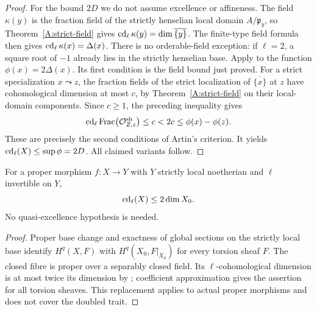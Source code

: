 \begin{proof}
For the bound $2D$ we do not assume excellence or affineness. The field $\kappa(y)$ is the fraction field of the strictly henselian local domain $A/\mathfrak p_y$, so Theorem~\ref{A:strict-field} gives $\operatorname{cd}_\ell\kappa(y)=\dim\overline{\{y\}}$. The finite-type field formula then gives $\operatorname{cd}_\ell\kappa(x)=\Delta(x)$. There is no orderable-field exception: if $\ell=2$, a square root of $-1$ already lies in the strictly henselian base. Apply \citet[Exposé X, Théorème 4.1]{A_SGA4} to the function $\phi(x)=2\Delta(x)$. Its first condition is the field bound just proved. For a strict specialization $x\leadsto z$, the fraction fields of the strict localization of $\overline{\{x\}}$ at $z$ have cohomological dimension at most $c$, by Theorem~\ref{A:strict-field} on their local-domain components. Since $c\geq1$, the preceding inequality gives
\[
\operatorname{cd}_\ell\operatorname{Frac}\bigl(\mathcal O_{Z,z}^{\mathrm{sh}}\bigr)
\leq c<2c\leq\phi(x)-\phi(z).
\]
These are precisely the second conditions of Artin's criterion. It yields $\operatorname{cd}_\ell(X)\leq\sup\phi=2D$. All claimed variants follow.
\end{proof}

\begin{proposition}
\label{A:proper-fibre}
For a proper morphism $f:X\to Y$ with $Y$ strictly local noetherian and $\ell$ invertible on $Y$,
\[
\operatorname{cd}_\ell(X)\leq2\dim X_0.
\]
No quasi-excellence hypothesis is needed.
\end{proposition}
\begin{proof}
Proper base change and exactness of global sections on the strictly local base identify $H^q(X,F)$ with $H^q(X_0,F|_{X_0})$ for every torsion sheaf $F$. The closed fibre is proper over a separably closed field. Its $\ell$-cohomological dimension is at most twice its dimension by \citet[Exposé X, Corollaire 4.3]{A_SGA4}; coefficient approximation gives the assertion for all torsion sheaves. This replacement applies to actual proper morphisms and does not cover the doubled trait.
\end{proof}

